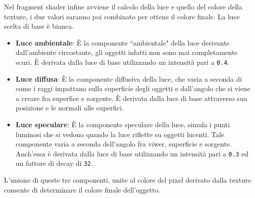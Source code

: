 Nel fragment shader infine avviene il calcolo della luce e quello del colore della texture, i due valori saranno poi combinato per ottene il colore finale. La luce scelta di base è bianca.
\begin{itemize}
\item \textbf{Luce ambientale}: È la componente ``ambientale" della luce derivante dall'ambiente circostante, gli oggetti infatti non sono mai completamente scuri. È derivata dalla luce di base utilizzando un intensità pari a \texttt{0.4}.

\item \textbf{Luce diffusa}: È la componente diffusiva della luce, che varia a seconda di come i raggi impattano sulla superficie degli oggetti e dall'angolo che si viene a creare fra superfice e sorgente. È derivata dalla luce di base attraverso sua posizione e le normali alle superfici.

\item \textbf{Luce speculare}: È la componente speculare della luce, simula i punti luminosi che si vedono quando la luce riflette su oggetti lucenti. Tale componente varia a seconda dell'angolo fra viwer, superficie e sorgente. Anch'essa è derivata dalla luce di base utilizzando un intensità pari a \texttt{0.3} ed un fattore di decay di \texttt{32}.
\end{itemize}

L'unione di queste tre componenti, unite al colore del pixel derivato dalla texture consente di determinare il colore finale dell'oggetto.

